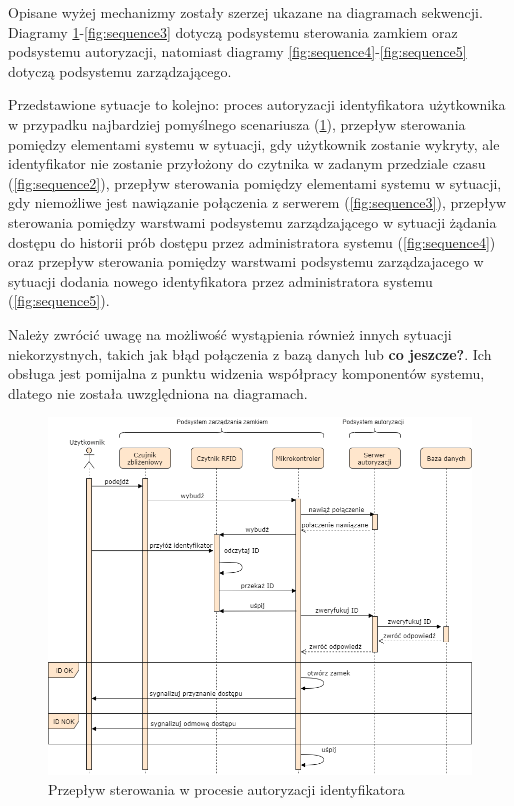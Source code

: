             Opisane wyżej mechanizmy zostały szerzej ukazane na diagramach sekwencji. Diagramy \ref{fig:sequence1}-\ref{fig:sequence3} dotyczą podsystemu sterowania zamkiem oraz podsystemu autoryzacji, natomiast diagramy \ref{fig:sequence4}-\ref{fig:sequence5} dotyczą podsystemu zarządzającego.

            Przedstawione sytuacje to kolejno: proces autoryzacji identyfikatora użytkownika w przypadku najbardziej pomyślnego scenariusza (\ref{fig:sequence1}), przepływ sterowania pomiędzy elementami systemu w sytuacji, gdy użytkownik zostanie wykryty, ale identyfikator nie zostanie przyłożony do czytnika w zadanym przedziale czasu (\ref{fig:sequence2}), przepływ sterowania pomiędzy elementami systemu w sytuacji, gdy niemożliwe jest nawiązanie połączenia z serwerem (\ref{fig:sequence3}), przepływ sterowania pomiędzy warstwami podsystemu zarządzającego w sytuacji żądania dostępu do historii prób dostępu przez administratora systemu (\ref{fig:sequence4}) oraz przepływ sterowania pomiędzy warstwami podsystemu zarządzajacego w sytuacji dodania nowego identyfikatora przez administratora systemu (\ref{fig:sequence5}).

            Należy zwrócić uwagę na możliwość wystąpienia również innych sytuacji niekorzystnych, takich jak błąd połączenia z bazą danych lub \textbf{co jeszcze?}. Ich obsługa jest pomijalna z punktu widzenia współpracy komponentów systemu, dlatego nie została uwzględniona na diagramach.

            \begin{figure}[]
                \includegraphics[width=\linewidth]{chapters/images/sequence1.png}
                \caption{Przepływ sterowania w procesie autoryzacji identyfikatora}
                \label{fig:sequence1}
            \end{figure}

